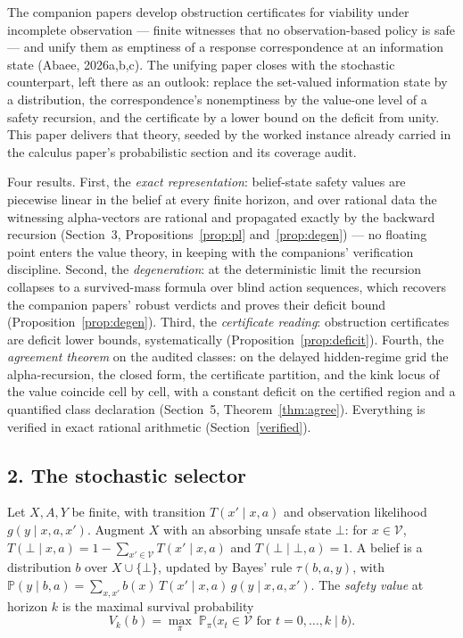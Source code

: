 \documentclass[10pt,twocolumn]{article}
\theoremstyle{definition}
\begin{document}
The companion papers develop obstruction certificates for viability under
incomplete observation --- finite witnesses that no observation-based policy
is safe --- and unify them as emptiness of a response correspondence at an
information state (Abaee, 2026a,b,c). The unifying paper closes with the
stochastic counterpart, left there as an outlook: replace the
set-valued information state by a distribution, the correspondence's
nonemptiness by the value-one level of a safety recursion, and the
certificate by a lower bound on the deficit from unity. This paper
delivers that theory, seeded by the worked instance already carried in the
calculus paper's probabilistic section and its coverage audit.

Four results. First, the \emph{exact representation}: belief-state safety
values are piecewise linear in the belief at every finite horizon, and over
rational data the witnessing alpha-vectors are rational and propagated
exactly by the backward recursion (Section~3, Propositions~\ref{prop:pl}
and~\ref{prop:degen}) --- no floating point enters the value theory, in
keeping with the companions' verification discipline. Second, the
\emph{degeneration}: at the deterministic limit the recursion collapses to
a survived-mass formula over blind action sequences, which recovers the
companion papers' robust verdicts and proves their deficit bound
(Proposition~\ref{prop:degen}). Third, the \emph{certificate reading}:
obstruction certificates are deficit lower bounds, systematically
(Proposition~\ref{prop:deficit}). Fourth, the \emph{agreement theorem} on
the audited classes: on the delayed hidden-regime grid the alpha-recursion,
the closed form, the certificate partition, and the kink locus of the value
coincide cell by cell, with a constant deficit on the certified region and
a quantified class declaration (Section~5, Theorem~\ref{thm:agree}).
Everything is verified in exact rational arithmetic
(Section~\ref{verified}).

\subsection{2. The stochastic selector}\label{model}

Let \(X, A, Y\) be finite, with transition \(T(x' \mid x, a)\) and
observation likelihood \(g(y \mid x, a, x')\). Augment \(X\) with an
absorbing unsafe state \(\bot\): for \(x \in \mathcal{V}\),
\(T(\bot \mid x, a) = 1 - \sum_{x' \in \mathcal{V}} T(x' \mid x, a)\) and
\(T(\bot \mid \bot, a) = 1\). A belief is a distribution \(b\) over
\(X \cup \{\bot\}\), updated by Bayes' rule
\(\tau(b, a, y)\), with
\(\mathbb{P}(y \mid b, a) = \sum_{x, x'} b(x)\, T(x' \mid x, a)\,
g(y \mid x, a, x')\). The \emph{safety value} at horizon \(k\) is the
maximal survival probability
\[
V_{k}(b) = \max_{\pi}\; \mathbb{P}_{\pi}\bigl( x_{t} \in \mathcal{V}
\text{ for } t = 0, \dots, k \;\big|\; b \bigr).
\]
\end{document}
